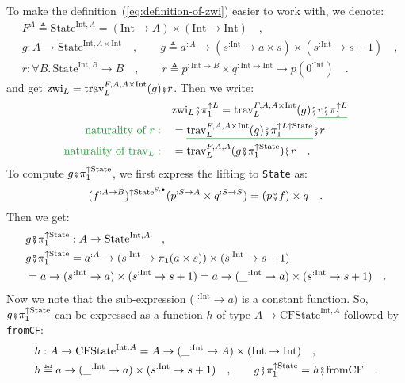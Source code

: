 To make the definition~(\ref{eq:definition-of-zwi}) easier to work
with, we denote:
\begin{align*}
 & F^{A}\triangleq\text{State}^{\text{Int},A}=(\text{Int}\rightarrow A)\times(\text{Int}\rightarrow\text{Int})\quad,\\
 & g:A\rightarrow\text{State}^{\text{Int},A\times\text{Int}}\quad,\quad\quad g\triangleq a^{:A}\rightarrow(s^{:\text{Int}}\rightarrow a\times s)\times(s^{:\text{Int}}\rightarrow s+1)\quad,\\
 & r:\forall B.\,\text{State}^{\text{Int},B}\rightarrow B\quad,\quad\quad r\triangleq p^{:\text{Int}\rightarrow B}\times q^{:\text{Int}\rightarrow\text{Int}}\rightarrow p(0^{:\text{Int}})\quad.
\end{align*}
and get $\text{zwi}_{L}=\text{trav}_{L}^{F,A,A\times\text{Int}}(g)\bef r$.
Then we write:
\begin{align*}
 & \text{zwi}_{L}\bef\pi_{1}^{\uparrow L}=\text{trav}_{L}^{F,A,A\times\text{Int}}(g)\bef\gunderline{r\bef\pi_{1}^{\uparrow L}}\\
{\color{greenunder}\text{naturality of }r:}\quad & =\gunderline{\text{trav}_{L}^{F,A,A\times\text{Int}}(g)\bef\pi_{1}^{\uparrow L\uparrow\text{State}}}\bef r\\
{\color{greenunder}\text{naturality of }\text{trav}_{L}:}\quad & =\text{trav}_{L}^{F,A,A}(g\bef\pi_{1}^{\uparrow\text{State}})\bef r\quad.
\end{align*}
To compute $g\bef\pi_{1}^{\uparrow\text{State}}$, we first express
the lifting to \lstinline!State! as:
\[
(f^{:A\rightarrow B})^{\uparrow\text{State}^{S,\bullet}}(p^{:S\rightarrow A}\times q^{:S\rightarrow S})=(p\bef f)\times q\quad.
\]
Then we get:
\begin{align*}
 & g\bef\pi_{1}^{\uparrow\text{State}}:A\rightarrow\text{State}^{\text{Int},A}\quad,\\
 & g\bef\pi_{1}^{\uparrow\text{State}}=a^{:A}\rightarrow(s^{:\text{Int}}\rightarrow\pi_{1}(a\times s))\times(s^{:\text{Int}}\rightarrow s+1)\\
 & =a\rightarrow(s^{:\text{Int}}\rightarrow a)\times(s^{:\text{Int}}\rightarrow s+1)=a\rightarrow(\_^{:\text{Int}}\rightarrow a)\times(s^{:\text{Int}}\rightarrow s+1)\quad.
\end{align*}
Now we note that the sub-expression ($\_^{:\text{Int}}\rightarrow a$)
is a constant function. So, $g\bef\pi_{1}^{\uparrow\text{State}}$
can be expressed as a function $h$ of type $A\rightarrow\text{CFState}^{\text{Int},A}$
followed by \lstinline!fromCF!:
\begin{align*}
 & h:A\rightarrow\text{CFState}^{\text{Int},A}=A\rightarrow(\_^{:\text{Int}}\rightarrow A)\times(\text{Int}\rightarrow\text{Int})\quad,\\
 & h\triangleq a\rightarrow(\_^{:\text{Int}}\rightarrow a)\times(s^{:\text{Int}}\rightarrow s+1)\quad,\quad\quad g\bef\pi_{1}^{\uparrow\text{State}}=h\bef\text{fromCF}\quad.
\end{align*}

